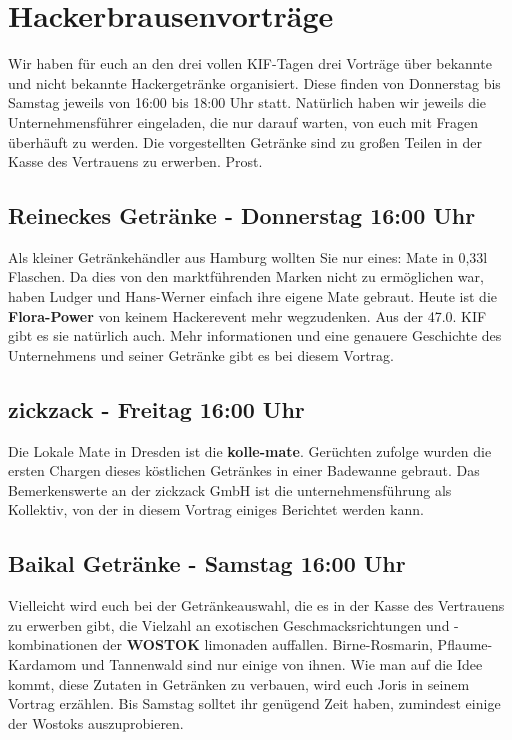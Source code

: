 
\section*{Hackerbrausenvorträge}
Wir haben für euch an den drei vollen KIF-Tagen drei Vorträge über bekannte und nicht bekannte
Hackergetränke organisiert. Diese finden von Donnerstag bis Samstag jeweils von 16:00 bis 18:00 Uhr
statt. Natürlich haben wir jeweils die Unternehmensführer eingeladen, die nur darauf warten, von
euch mit Fragen überhäuft zu werden. Die vorgestellten Getränke sind zu großen Teilen in der Kasse
des Vertrauens zu erwerben. Prost.

\subsection*{Reineckes Getränke - Donnerstag 16:00 Uhr}
Als kleiner Getränkehändler aus Hamburg wollten Sie nur eines: Mate in 0,33l Flaschen. Da dies von
den marktführenden Marken nicht zu ermöglichen war, haben Ludger und Hans-Werner einfach ihre eigene
Mate gebraut. Heute ist die \textbf{Flora-Power} von keinem Hackerevent mehr wegzudenken. Aus der
47.0. KIF gibt es sie natürlich auch. Mehr informationen und eine genauere Geschichte des
Unternehmens und seiner Getränke gibt es bei diesem Vortrag.

\subsection*{zickzack - Freitag 16:00 Uhr}
Die Lokale Mate in Dresden ist die \textbf{kolle-mate}. Gerüchten zufolge wurden die ersten Chargen
dieses köstlichen Getränkes in einer Badewanne gebraut. Das Bemerkenswerte an der zickzack GmbH ist
die unternehmensführung als Kollektiv, von der in diesem Vortrag einiges Berichtet werden kann.

\subsection*{Baikal Getränke - Samstag 16:00 Uhr}
Vielleicht wird euch bei der Getränkeauswahl, die es in der Kasse des Vertrauens zu erwerben gibt,
die Vielzahl an exotischen Geschmacksrichtungen und -kombinationen der \textbf{WOSTOK} limonaden
auffallen. Birne-Rosmarin, Pflaume-Kardamom und Tannenwald sind nur einige von ihnen. Wie man auf
die Idee kommt, diese Zutaten in Getränken zu verbauen, wird euch Joris in seinem Vortrag erzählen.
Bis Samstag solltet ihr genügend Zeit haben, zumindest einige der Wostoks auszuprobieren.
